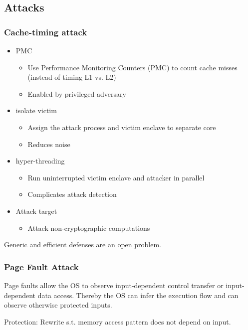 \subsection{Attacks}
\subsubsection{Cache-timing attack}
\begin{itemize}
  \item  PMC
    \begin{itemize}
      \item Use Performance Monitoring Counters (PMC) to count cache misses
	(instead of timing L1 vs. L2)
      \item Enabled by privileged adversary
    \end{itemize}
  \item  isolate victim
    \begin{itemize}
      \item Assign the attack process and victim enclave to separate core
      \item Reduces noise
    \end{itemize}
  \item  hyper-threading
    \begin{itemize}
      \item Run uninterrupted victim enclave and attacker in parallel
      \item Complicates attack detection
    \end{itemize}
  \item Attack target
    \begin{itemize}
      \item Attack non-cryptographic computations
    \end{itemize}
\end{itemize}
Generic and efficient defenses  are an open problem.

\subsubsection{Page Fault Attack}
Page faults allow the OS to observe input-dependent control transfer or
input-dependent data access. Thereby the OS can infer the execution flow and
can observe otherwise protected inputs.

Protection: Rewrite s.t. memory access pattern does not depend on input.
